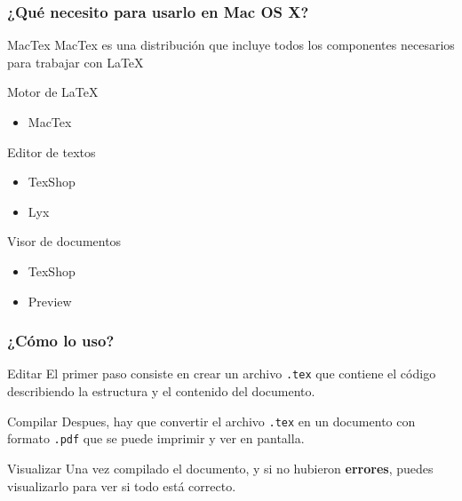 \documentclass[12pt]{beamer}
\begin{document}
\begin{frame}%
  \frametitle{¿Qué necesito para usarlo en Mac OS X?}
  \begin{block}{MacTex}
    MacTex es una distribución que incluye todos los componentes necesarios para trabajar con \textrm{\LaTeX{}}
  \end{block}
  \begin{block}{Motor de \textrm{\LaTeX{}}}
    \begin{itemize}
    \item MacTex
    \end{itemize}
  \end{block}
  \begin{block}{Editor de textos}
    \begin{itemize}
    \item TexShop
    \item Lyx
    \end{itemize}
  \end{block}
  \begin{block}{Visor de documentos}
    \begin{itemize}
    \item TexShop
    \item Preview
    \end{itemize}
  \end{block}
\end{frame}

\begin{frame}%
  \frametitle{¿Cómo lo uso?}\pause
  \begin{block}{Editar}
    El primer paso consiste en crear un archivo \texttt{.tex} que contiene el código describiendo la estructura y el contenido del documento.
  \end{block}\pause
  \begin{block}{Compilar}
    Despues, hay que convertir el archivo \texttt{.tex} en un documento con formato \texttt{.pdf} que se puede imprimir y ver en pantalla.
  \end{block}\pause
  \begin{block}{Visualizar}
    Una vez compilado el documento, y si no hubieron \textbf{errores}, puedes visualizarlo para ver si todo está correcto.
  \end{block}
\end{frame}
\end{document}
